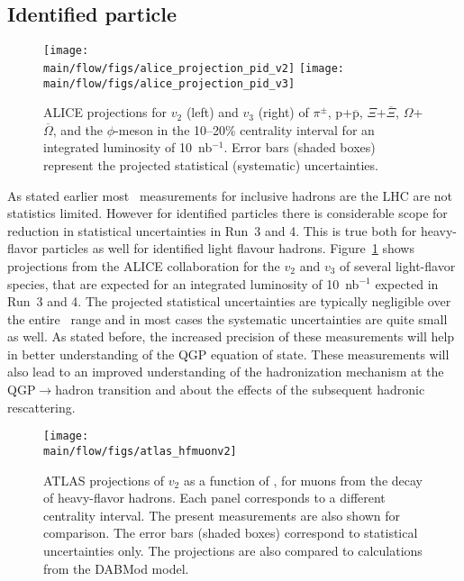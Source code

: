 \subsection{Identified particle \vn}\label{sec:identified_particle_vn}


\begin{figure}[!htb]
\begin{center}
\texttt{[image: \\main/flow/figs/alice\_projection\_pid\_v2]}
\texttt{[image: \\main/flow/figs/alice\_projection\_pid\_v3]}
\caption{
ALICE projections for $v_2$ (left) and $v_3$ (right) of $\pi^\pm$, 
  $\mathrm{p}$+$\overline{\mathrm{p}}$, $\Xi$+$\overline{\Xi}$, 
  $\Omega$+$\overline{\Omega}$, and the $\phi$-meson 
  in the 10--20\% centrality interval
  for an integrated luminosity of 10~nb$^{-1}$. 
Error bars (shaded boxes) represent the projected statistical 
  (systematic) uncertainties.}
\label{fig:alice_vn}
\end{center}
\end{figure}

As stated earlier most \vn\ measurements for inclusive hadrons are the LHC 
  are not statistics limited.
However for identified particles there is considerable scope for reduction 
  in statistical uncertainties in Run~3 and 4.
This is true both for heavy-flavor particles 
  as well for identified light flavour hadrons.
Figure~\ref{fig:alice_vn} shows projections from the ALICE collaboration for 
  the $v_2$ and $v_3$ of several light-flavor species, that are expected for 
  an integrated luminosity of 10~nb$^{-1}$ expected in Run~3 and 4. 
The projected statistical uncertainties are typically negligible over the 
  entire \pt\ range and in most cases the systematic uncertainties are 
  quite small as well.
As stated before, the increased precision of these measurements will help in 
  better understanding of the QGP equation of state. 
These measurements will also lead to an improved understanding 
  of the hadronization mechanism at the QGP$\rightarrow$hadron transition
  and about the effects of the subsequent hadronic rescattering.


\begin{figure}[!htb]
\begin{center}
\texttt{[image: \\main/flow/figs/atlas\_hfmuonv2]}
\caption{
ATLAS projections of $v_2$ as a function of \pt, for muons from the decay of 
  heavy-flavor hadrons. 
Each panel corresponds to a different centrality interval. 
The present measurements are also shown for comparison. 
The error bars (shaded boxes) correspond to statistical uncertainties only. 
The projections are also compared to calculations from the DABMod model.}
\label{fig:atlas_hf_v2}
\end{center}
\end{figure}

